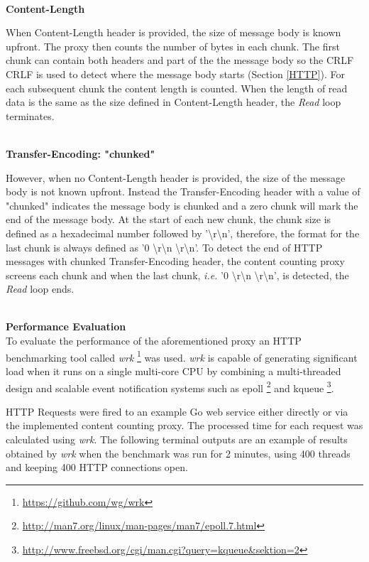 \documentclass[a4paper,11pt,twoside]{article}
\begin{document}
\noindent\\
\textbf{Content-Length}

When Content-Length header is provided, the size of message body is known upfront.  The proxy then counts the number of bytes in each chunk.  The first chunk can contain both headers and part of the the message body so the CRLF CRLF is used to detect where the message body starts (Section \ref{HTTP}). For each subsequent chunk the content length is counted. When the length of read data is the same as the size defined in Content-Length header, the \textit{Read} loop terminates.

\noindent\\
\textbf{Transfer-Encoding: "chunked"}

However, when no Content-Length header is provided, the size of the message body is not known upfront. Instead the Transfer-Encoding header with a value of "chunked" indicates the message body is chunked and a zero chunk will mark the end of the message body.  At the start of each new chunk, the chunk size is defined as a hexadecimal number followed by '\textbackslash r\textbackslash n', therefore, the format for the last chunk is always defined as '0 \textbackslash r\textbackslash n \textbackslash r\textbackslash n'. To detect the end of HTTP messages with chunked Transfer-Encoding header, the content counting proxy screens each chunk and when the last chunk, \textit{i.e.} '0 \textbackslash r\textbackslash n \textbackslash r\textbackslash n', is detected, the  \textit{Read} loop ends. 


\noindent\\
\textbf{Performance Evaluation}\\
To evaluate the performance of the aforementioned proxy an HTTP benchmarking tool called \textit{wrk} \footnote{\label{wrk} \url{https://github.com/wg/wrk}} was used. \textit{wrk} is capable of generating significant load when it runs on a single multi-core CPU by combining a multi-threaded design and scalable event notification systems such as epoll \footnote{\label{epoll} \url{http://man7.org/linux/man-pages/man7/epoll.7.html}} and kqueue \footnote{\label{kqueue} \url{http://www.freebsd.org/cgi/man.cgi?query=kqueue&sektion=2}}.



HTTP Requests were fired to an example Go web service either directly or via the implemented content counting proxy. The processed time for each request was calculated using \textit{wrk}. The following terminal outputs are an example of results obtained by \textit{wrk} when the benchmark was run for 2 minutes, using 400 threads and keeping 400 HTTP connections open. \bigskip  
\end{document}
